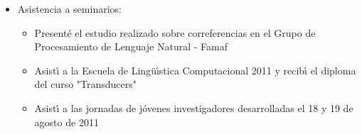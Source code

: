 \begin{itemize}
\begin{itemize}
En esta materia estoy realizando un surface realizer para el espa\~{n}ol, un surface realizer es un m\'odulo de generaci\'on de lenguaje natural que toma informaci\'on sem\'antica y retorna texto en lenguaje natural que corresponde a la sem\'antica dada.\\
\end{itemize}
\item Asistencia a seminarios:\\
\begin{itemize}
\item Present\'e el estudio realizado sobre correferencias en el Grupo de Procesamiento de Lenguaje Natural - Famaf\\
\item Asist\'{\i} a la Escuela de Ling\"u\'{\i}stica Computacional 2011 y recib\'{\i} el diploma del curso "Transducers"\\
\item Asist\'{\i} a las jornadas de j\'ovenes investigadores desarrolladas el 18 y 19 de agosto de 2011
\end{itemize}
\end{itemize}
